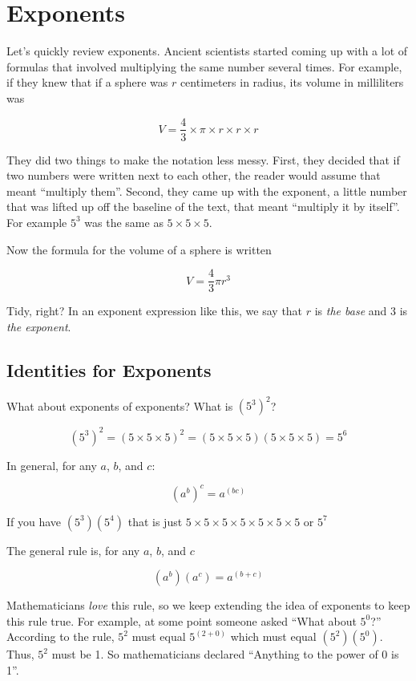 \chapter{Exponents}

Let's quickly review exponents. Ancient scientists started coming up
with a lot of formulas that involved multiplying the same number
several times.  For example, if they knew that if a sphere was $r$
centimeters in radius, its volume in milliliters was

$$V = \frac{4}{3} \times \pi \times r \times r \times r$$

They did two things to make the notation less messy.  First, they
decided that if two numbers were written next to each other, the
reader would assume that meant ``multiply them''.  Second, they came
up with the exponent, a little number that was lifted up off the
baseline of the text, that meant ``multiply it by itself''.  For
example $5^3$ was the same as $5 \times 5 \times 5$.

Now the formula for the volume of a sphere is written

$$V = \frac{4}{3} \pi r^3$$

Tidy, right? In an exponent expression like this, we say that $r$ is
\textit{the base} and $3$ is \textit{the exponent}.

\section{Identities for Exponents}

What about exponents of exponents?  What is $\left(5^3\right)^2$?

$$\left(5^3\right)^2 = (5 \times 5 \times 5)^2 = (5 \times 5 \times 5)(5 \times 5 \times 5) = 5^6$$

In general, for any $a$, $b$, and $c$:

$$\left(a^b\right)^c = a^{(bc)}$$

If you have $\left( 5^3 \right) \left(5^4 \right)$ that is just $5 \times 5 \times 5 \times 5 \times 5 \times 5 \times 5$ or $5^7$

The general rule is, for any $a$, $b$, and $c$

$$\left(a^b\right)\left(a^c\right) = a^{(b + c)}$$

Mathematicians \textit{love} this rule, so we keep extending the idea
of exponents to keep this rule true. For example, at some point
someone asked ``What about $5^0$?'' According to the rule, $5^{2}$
must equal $5^{(2 + 0)}$ which must equal
$\left(5^2\right)\left(5^0\right)$.  Thus, $5^2$ must be 1. So
mathematicians declared ``Anything to the power of 0 is 1''.

